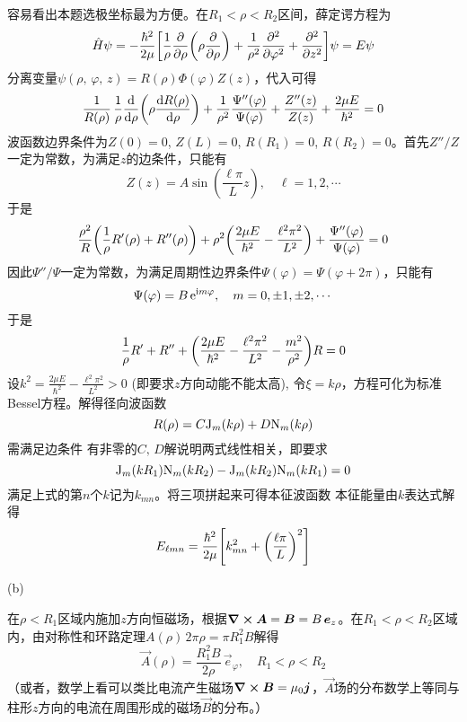 \begin{enumerate}[label=\textbf{5.\Alph*}, listparindent=\parindent]
容易看出本题选极坐标最为方便。在$R_1<\rho<R_2$区间，薛定谔方程为
\[\hat{H}\psi = -\frac{\hbar^2}{2\mu}\qty[\frac{1}{\rho}\pdv{\rho}\qty(\rho\pdv{\rho})+\frac{1}{\rho^2}\pdv[2]{\varphi}+\pdv[2]{z}]\psi = E\psi\]
分离变量$\psi(\rho,\,\varphi,\,z)=R(\rho)\Phi(\varphi)Z(z)$，代入可得
\[\frac{1}{R(\rho)}\,\frac{1}{\rho}\dv{\rho}\qty(\rho\dv{R(\rho)}{\rho})+\frac{1}{\rho^2}\frac{\Psi''(\varphi)}{\Psi(\varphi)}+\frac{Z''(z)}{Z(z)} + \frac{2\mu E}{\hbar^2}=0\]
波函数边界条件为$Z(0)=0$, $Z(L)=0$, $R(R_1)=0$, $R(R_2)=0$。首先$Z''/Z$一定为常数，为满足$z$的边条件，只能有
\[Z(z)=A\sin(\frac{\ell \pi}{L}z),\quad \ell=1,2,\cdots\]
于是
\[\frac{\rho^2}{R}\qty(\frac{1}{\rho} R'(\rho)+R''(\rho))+\rho^2\qty(\frac{2\mu E}{\hbar^2}-\frac{\ell^2 \pi^2}{L^2})+\frac{\Psi''(\varphi)}{\Psi(\varphi)}=0\]
因此$\Psi''/\Psi$一定为常数，为满足周期性边界条件$\Psi(\varphi)=\Psi(\varphi+2\pi)$，只能有
\[\Psi(\varphi)=B\,\mathrm{e}^{\mathrm{i} m\varphi},\quad m=0,\pm1,\pm2,\cdots\]
于是
\begin{equation}\label{eq:1}
    \frac{1}{\rho}R'+R''+\qty(\frac{2\mu E}{\hbar^2}-\frac{\ell^2\pi^2}{L^2}-\frac{m^2}{\rho^2})R=0
\end{equation}
设$k^2 = \frac{2\mu E}{\hbar^2}-\frac{\ell^2\pi^2}{L^2}>0$ (即要求$z$方向动能不能太高), 令$\xi =k\rho$，方程可化为标准Bessel方程。解得径向波函数
\[R(\rho)=C\mathrm{J}_m(k\rho) + D\mathrm{N}_m(k\rho)\]
需满足边条件
有非零的$C,\,D$解说明两式线性相关，即要求
\[\mathrm{J}_m(kR_1)\mathrm{N}_m(kR_2)-\mathrm{J}_m(kR_2)\mathrm{N}_m(kR_1)=0\]
满足上式的第$n$个$k$记为$k_{mn}$。将三项拼起来可得本征波函数
本征能量由$k$表达式解得
\[E_{\ell mn} =\frac{\hbar^2}{2\mu}\qty[k_{mn}^2+\qty(\frac{\ell\pi}{L})^2]\]

\noindent (b)

在$\rho<R_1$区域内施加$z$方向恒磁场，根据$\curl{\boldsymbol{A}}=\boldsymbol{B}=B\,\boldsymbol{e}_z$。在$R_1<\rho<R_2$区域内，由对称性和环路定理$A(\rho)\,2\pi\rho = \pi R_1^2 B$解得
\[\vec{A}(\rho)=\frac{R_1^2B}{2\rho}\,\vec{e}_\varphi,\quad R_1<\rho<R_2\]
（或者，数学上看可以类比电流产生磁场$\curl{\boldsymbol{B}}=\mu_0 \boldsymbol{j}$，$\vec{A}$场的分布数学上等同与柱形$z$方向的电流在周围形成的磁场$\vec{B}$的分布。）


\end{enumerate}
